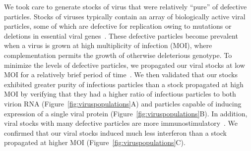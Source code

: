 \documentclass[9pt,lineno]{elife}
\begin{document}
We took care to generate stocks of virus that were relatively ``pure'' of defective particles.
Stocks of viruses typically contain an array of biologically active viral particles, some of which are defective for replication owing to mutations or deletions in essential viral genes~\citep{von1954incomplete,huang1970defective,Brooke:2014ch,Fonville:2015cg,Lauring:2010if,Dimmock:2014dk}.
These defective particles become prevalent when a virus is grown at high multiplicity of infection (MOI), where complementation permits the growth of otherwise deleterious genotype.
To minimize the levels of defective particles, we propagated our viral stocks at low MOI for a relatively brief period of time~\citep{Xue:2016bw}.
We then validated that our stocks exhibited greater purity of infectious particles than a stock propagated at high MOI by verifying that they had a higher ratio of infectious particles to both virion RNA (Figure~\ref{fig:viruspopulations}A) and particles capable of inducing expression of a single viral protein (Figure~\ref{fig:viruspopulations}B).
In addition, viral stocks with many defective particles are more immunostimulatory~\citep{Tapia:2013kf,Lopez:2014en}.
We confirmed that our viral stocks induced much less interferon than a stock propagated at higher MOI (Figure~\ref{fig:viruspopulations}C).
\end{document}
